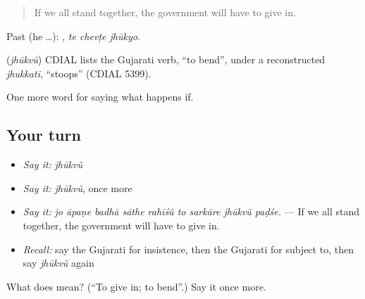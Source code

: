 \begin{quote}
If we all stand together, the government will have to give in.
\end{quote}

Past (he …):   , \emph{te chevṭe jhūkyo}.

\begin{cousinweb}
\textbf{} (\emph{jhūkvũ}) CDIAL lists the Gujarati verb, \textquotedblleft{}to bend\textquotedblright{}, under a reconstructed \emph{jhukkati}, \textquotedblleft{}stoops\textquotedblright{} (CDIAL 5399).
\end{cousinweb}

\begin{grammarlens}[title={What you've built}]
One more word for saying what happens if.
\end{grammarlens}

\subsection*{Your turn}
\begin{itemize}
\raggedright
  \item \emph{Say it:} \emph{jhūkvũ}
  \item \emph{Say it:} \emph{jhūkvũ}, once more
  \item \emph{Say it:} \emph{jo āpaṇe badhā sāthe rahīśũ to sarkāre jhūkvũ paḍśe.} — If we all stand together, the government will have to give in.
  \item \emph{Recall:} say the Gujarati for insistence, then the Gujarati for subject to, then say \emph{jhūkvũ} again
\end{itemize}

\begin{tcolorbox}[breakable,colback=teal!4,colframe=teal!35!black,title={Before you move on}]
What does  mean? (\textquotedblleft{}To give in; to bend\textquotedblright{}.) Say it once more.
\end{tcolorbox}
